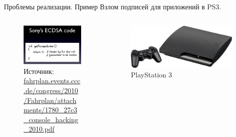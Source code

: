 \documentclass{beamer}
\begin{document}
\begin{frame}{Проблемы реализации. Пример}
	Взлом подписей для приложений в PS3.
	
	\begin{columns}
		\begin{column}{0.6\textwidth}
			\begin{figure}
				\includegraphics[scale=0.3]{../images/ps3_example2}
				\caption*{\tiny Источник:
					\href{https://fahrplan.events.ccc.de/congress/2010/Fahrplan/attachments/1780_27c3_console_hacking_2010.pdf}{fahrplan.events.ccc.de/congress/2010/Fahrplan/attachments/1780\_27c3\_console\_hacking\_2010.pdf}
					}
			\end{figure}
		\end{column}
		
		\begin{column}{0.4\textwidth}
			\begin{figure}
				\includegraphics[scale=0.13]{../images/ps3_example1}
				\caption*{PlayStation 3}
			\end{figure}
		\end{column}
	\end{columns}

\end{frame}
	
\end{document}
